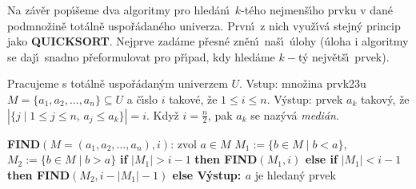 \centerline{}
\bigskip

\flushpar Na z\'av\v er pop\'\i\v seme dva algoritmy pro hled\'an\'\i\ $
k$-t\'eho 
nejmen\v s\'\i\-ho prvku v dan\'e podmno\v zin\v e tot\'aln\v e 
uspo\v r\'adan\'e\-ho univerza. Prv\-n\'\i\ z nich vyu\v z\'\i v\'a  
stejn\'y princip jako {\bf QUICKSORT}. Nejprve zad\'ame 
p\v resn\'e zn\v e\-n\'\i\ na\v s\'\i\ \'ulohy (\'uloha i algoritmy se daj\'\i\ 
snadno p\v reformulovat pro p\v r\'\i pad, kdy hled\'ame $k-$t\'y 
nejv\v et\v s\'\i\ prvek).
\medskip

\flushpar Pracujeme s tot\'aln\v e uspo\v r\'adan\'ym univerzem $
U$.\newline 
Vstup: mno\v zina prvk\accent23u $M=\{a_1,a_2,\dots,a_n\}\subseteq 
U$ a \v c\'\i slo $i$ takov\'e, 
\v ze $1\le i\le n$.\newline 
V\'ystup: prvek $a_k$ takov\'y, \v ze 
$|\{j\mid 1\le j\le n,\,a_j\le a_k\}|=i$.\newline 
Kdy\v z $i=\frac n2$, pak $a_k$ se naz\'yv\'a \emph{medi\'an}.
\bigskip

{\bf FIND$(M=(a_1,a_2,\dots,a_n),i)$}:\newline 
zvol $a\in M$\newline
$M_1:=\{b\in M\mid b<a\}$, 
$M_2:=\{b\in M\mid b>a\}$\newline 
{\bf if} $|M_1|>i-1$ {\bf then\newline 
\phantom{{\rm ---}}FIND$(M_1,i)$\newline 
else\newline 
\phantom{{\rm ---}}if} $|M_1|<i-1$ {\bf then\newline 
\phantom{{\rm ------}}FIND$(M_2,i-|M_1|-1)$\newline 
\phantom{{\rm ---}}else\newline 
\phantom{{\rm------}}V\'ystup: $a$} je hledan\'y prvek\newline 
\phantom{---}{\bf endif\newline 
endif}
\bigskip

